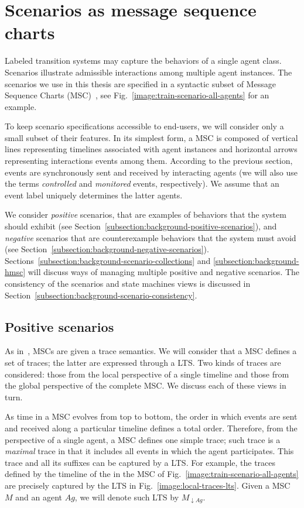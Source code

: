 \section{Scenarios as message sequence charts\label{section:background-scenarios}}

Labeled transition systems may capture the behaviors of a single agent class. Scenarios illustrate admissible interactions among multiple agent instances. The scenarios we use in this thesis are specified in a syntactic subset of Message Sequence Charts (MSC)~\cite{ITU:1996}, see Fig.~\ref{image:train-scenario-all-agents} for an example. 

To keep scenario specifications accessible to end-users, we will consider only a small subset of their features. In its simplest form, a MSC is composed of vertical lines representing timelines associated with agent instances and horizontal arrows representing interactions events among them. According to the previous section, events are synchronously sent and received by interacting agents (we will also use the terms \emph{controlled} and \emph{monitored} events, respectively). We assume that an event label uniquely determines the latter agents. 

We consider \emph{positive} scenarios, that are examples of behaviors that the system should exhibit (see Section~\ref{subsection:background-positive-scenarios}), and \emph{negative} scenarios that are counterexample behaviors that the system must avoid (see Section~\ref{subsection:background-negative-scenarios}). Sections~\ref{subsection:background-scenario-collections} and \ref{subsection:background-hmsc} will discuss ways of managing multiple positive and negative scenarios. The consistency of the scenarios and state machines views is discussed in Section~\ref{subsection:background-scenario-consistency}.

\subsection{Positive scenarios\label{subsection:background-positive-scenarios}}

As in~\cite{Uchitel:2004}, MSCs are given a trace semantics. We will consider that a MSC defines a set of traces; the latter are expressed through a LTS. Two kinds of traces are considered: those from the local perspective of a single timeline and those from the global perspective of the complete MSC. We discuss each of these views in turn.

As time in a MSC evolves from top to bottom, the order in which events are sent and received along a particular timeline defines a total order. Therefore, from the perspective of a single agent, a MSC defines one simple trace; such trace is a \emph{maximal} trace in that it includes all events in which the agent participates. This trace and all its suffixes can be captured by a LTS. For example, the traces defined by the timeline of the  in the MSC of Fig.~\ref{image:train-scenario-all-agents} are precisely captured by the LTS in Fig.~\ref{image:local-traces-lts}. Given a MSC $M$ and an agent $Ag$, we will denote such LTS by $M_{\downarrow Ag}$.

